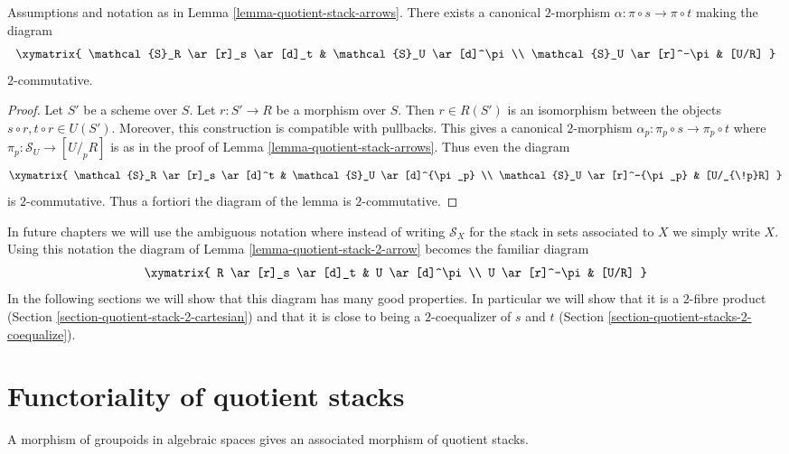 \begin{lemma}
\label{lemma-quotient-stack-2-arrow}
Assumptions and notation as in Lemma \ref{lemma-quotient-stack-arrows}.
There exists a canonical $2$-morphism
$\alpha : \pi \circ s \to \pi \circ t$ making the diagram
$$
\xymatrix{
\mathcal{S}_R \ar[r]_s \ar[d]_t & \mathcal{S}_U \ar[d]^\pi \\
\mathcal{S}_U \ar[r]^-\pi & [U/R]
}
$$
$2$-commutative.
\end{lemma}

\begin{proof}
Let $S'$ be a scheme over $S$. Let $r : S' \to R$ be a morphism over $S$.
Then $r \in R(S')$ is an isomorphism between the objects
$s \circ r, t \circ r \in U(S')$. Moreover, this construction is
compatible with pullbacks. This gives a canonical
$2$-morphism $\alpha_p : \pi_p \circ s \to \pi_p \circ t$
where $\pi_p : \mathcal{S}_U \to [U/_{\!p}R]$ is as in the
proof of
Lemma \ref{lemma-quotient-stack-arrows}. Thus even the diagram
$$
\xymatrix{
\mathcal{S}_R \ar[r]_s \ar[d]^t & \mathcal{S}_U \ar[d]^{\pi_p} \\
\mathcal{S}_U \ar[r]^-{\pi_p} & [U/_{\!p}R]
}
$$
is $2$-commutative. Thus a fortiori the diagram
of the lemma is $2$-commutative.
\end{proof}

\begin{remark}
\label{remark-fundamental-square}
In future chapters we will use the ambiguous notation where
instead of writing $\mathcal{S}_X$ for the stack in sets associated
to $X$ we simply write $X$. Using this notation the diagram of
Lemma \ref{lemma-quotient-stack-2-arrow}
becomes the familiar diagram
$$
\xymatrix{
R \ar[r]_s \ar[d]_t & U \ar[d]^\pi \\
U \ar[r]^-\pi & [U/R]
}
$$
In the following sections we will show that this diagram has
many good properties. In particular we will show that it is
a $2$-fibre product
(Section \ref{section-quotient-stack-2-cartesian})
and that it is close to being a $2$-coequalizer of $s$ and $t$
(Section \ref{section-quotient-stacks-2-coequalize}).
\end{remark}




\section{Functoriality of quotient stacks}
\label{section-functoriality-quotient-stacks}

\noindent
A morphism of groupoids in algebraic spaces gives an associated morphism
of quotient stacks.

